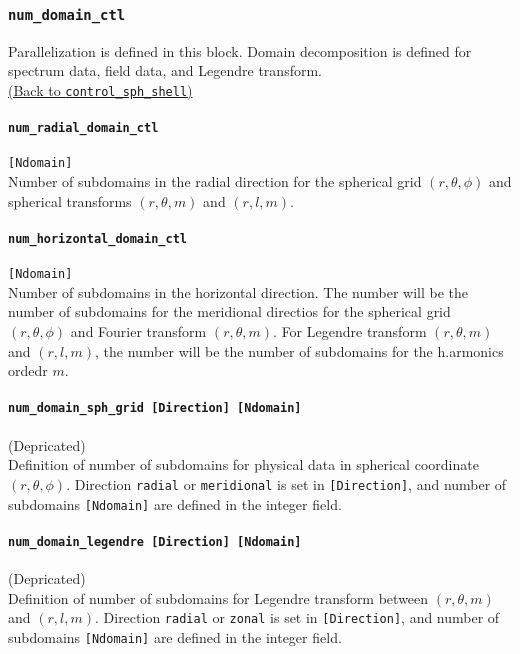 \subsubsection{\tt num\_domain\_ctl}
\label{href_t:num_domain_ctl}
Parallelization is defined in this block. Domain decomposition is defined for spectrum data, field data, and Legendre transform. \\
\hyperref[href_i:num_domain_ctl]{(Back to {\tt control\_sph\_shell})}

\paragraph{\tt num\_radial\_domain\_ctl}
\label{href_t:num_radial_domain_ctl}
\verb|[Ndomain]| \\
Number of subdomains in the radial direction for the spherical grid $(r, \theta, \phi)$ and spherical transforms $(r, \theta, m)$ and $(r, l, m)$.

\paragraph{\tt num\_horizontal\_domain\_ctl}
\label{href_t:num_horizontal_domain_ctl} 
\verb|[Ndomain]| \\
Number of subdomains in the horizontal direction. The number will be the number of subdomains for the meridional directios for the spherical grid $(r, \theta, \phi)$ and Fourier transform $(r, \theta, m)$. For Legendre transform $(r, \theta, m)$ and $(r, l, m)$, the number will be the number of subdomains for the h.armonics ordedr $m$.


\paragraph{\color{magenta} \tt num\_domain\_sph\_grid    [Direction]    [Ndomain]}
\label{href_t:num_domain_sph_grid} 
{\color{magenta} (Depricated)}\\
 Definition of number of subdomains for physical data in spherical coordinate $(r, \theta, \phi)$. Direction {\tt  radial} or {\tt meridional} is set in \verb|[Direction]|, and number of subdomains \verb|[Ndomain]| are defined in the integer field.

\paragraph{\color{magenta} \tt num\_domain\_legendre    [Direction]    [Ndomain]}
\label{href_t:num_domain_legendre}
{\color{magenta} (Depricated)}\\
 Definition of number of subdomains for Legendre transform between $(r, \theta, m)$ and $(r, l, m)$. Direction {\tt  radial} or {\tt zonal} is set in \verb|[Direction]|, and number of subdomains \verb|[Ndomain]| are defined in the integer field.

